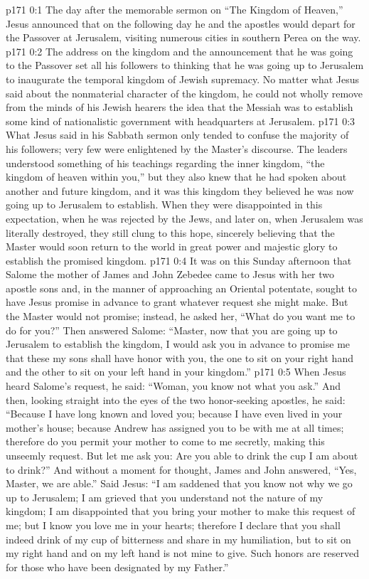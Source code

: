\author{Midwayer Commission}
\vs p171 0:1 The day after the memorable sermon on “The Kingdom of Heaven,” Jesus announced that on the following day he and the apostles would depart for the Passover at Jerusalem, visiting numerous cities in southern Perea on the way.
\vs p171 0:2 The address on the kingdom and the announcement that he was going to the Passover set all his followers to thinking that he was going up to Jerusalem to inaugurate the temporal kingdom of Jewish supremacy. No matter what Jesus said about the nonmaterial character of the kingdom, he could not wholly remove from the minds of his Jewish hearers the idea that the Messiah was to establish some kind of nationalistic government with headquarters at Jerusalem.
\vs p171 0:3 What Jesus said in his Sabbath sermon only tended to confuse the majority of his followers; very few were enlightened by the Master’s discourse. The leaders understood something of his teachings regarding the inner kingdom, \textcolor{ubdarkred}{“the kingdom of heaven within you,”} but they also knew that he had spoken about another and future kingdom, and it was this kingdom they believed he was now going up to Jerusalem to establish. When they were disappointed in this expectation, when he was rejected by the Jews, and later on, when Jerusalem was literally destroyed, they still clung to this hope, sincerely believing that the Master would soon return to the world in great power and majestic glory to establish the promised kingdom.
\pc \vs p171 0:4 It was on this Sunday afternoon that Salome the mother of James and John Zebedee came to Jesus with her two apostle sons and, in the manner of approaching an Oriental potentate, sought to have Jesus promise in advance to grant whatever request she might make. But the Master would not promise; instead, he asked her, \textcolor{ubdarkred}{“What do you want me to do for you?”} Then answered Salome: “Master, now that you are going up to Jerusalem to establish the kingdom, I would ask you in advance to promise me that these my sons shall have honor with you, the one to sit on your right hand and the other to sit on your left hand in your kingdom.”
\vs p171 0:5 When Jesus heard Salome’s request, he said: \textcolor{ubdarkred}{“Woman, you know not what you ask.”} And then, looking straight into the eyes of the two honor\hyp{}seeking apostles, he said: \textcolor{ubdarkred}{“Because I have long known and loved you; because I have even lived in your mother’s house; because Andrew has assigned you to be with me at all times; therefore do you permit your mother to come to me secretly, making this unseemly request. But let me ask you: Are you able to drink the cup I am about to drink?”} And without a moment for thought, James and John answered, “Yes, Master, we are able.” Said Jesus: \textcolor{ubdarkred}{“I am saddened that you know not why we go up to Jerusalem; I am grieved that you understand not the nature of my kingdom; I am disappointed that you bring your mother to make this request of me; but I know you love me in your hearts; therefore I declare that you shall indeed drink of my cup of bitterness and share in my humiliation, but to sit on my right hand and on my left hand is not mine to give. Such honors are reserved for those who have been designated by my Father.”}
